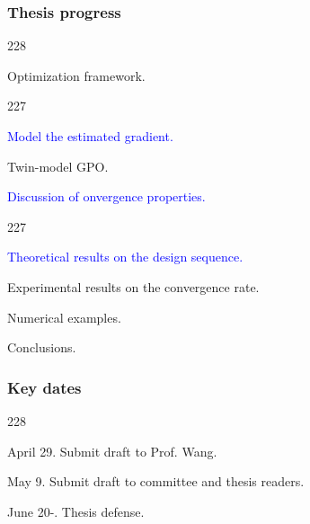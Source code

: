 \documentclass{beamer}
\newcommand{\barrow}{\item[\color{darkred}\ding{228}]}
\newcommand{\carrow}{\item[\color{darkred}\ding{227}]}
\begin{document}
\begin{frame}
    \frametitle{Thesis progress}
    \begin{dinglist}{228}
        \barrow Optimization framework.
        \begin{dinglist}{227}
            \carrow \textcolor{blue}{Model the estimated gradient.}
            \carrow Twin-model GPO.
            \carrow \textcolor{blue}{Discussion of onvergence properties.}
            \begin{dinglist}{227}
                \carrow \textcolor{blue}{Theoretical results on the design sequence.}
                \carrow Experimental results on the convergence rate.
            \end{dinglist}
            \carrow Numerical examples.
        \end{dinglist}
        \barrow Conclusions.
    \end{dinglist}
\end{frame}

\begin{frame}
    \frametitle{Key dates}
    \begin{dinglist}{228}
        \barrow April 29. Submit draft to Prof. Wang. 
        \barrow May 9. Submit draft to committee and thesis readers.
        \barrow June 20-. Thesis defense.
    \end{dinglist}
\end{frame}
\end{document}
